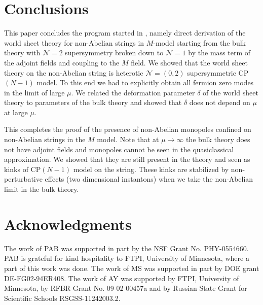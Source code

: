 \documentclass[12pt]{article}
\newcommand{\ntwo}{${\mathcal N}=2$ }
\newcommand{\ntwoo}{${\mathcal N}= \left(0,2\right) $ }
\newcommand{\none}{${\mathcal N}=1$ }
\begin{document}
\section{Conclusions}
\setcounter{equation}{0}

This paper concludes the program started in \cite{GSYmmodel},
namely direct derivation of the world sheet theory  for non-Abelian strings in $M$-model
starting from the bulk theory with \ntwo supersymmetry broken down to \none
by the mass term of the adjoint fields and coupling to the $M$ field.
We showed  that the world sheet
theory on the non-Abelian string is heterotic \ntwoo supersymmetric CP$(N-1)$ model.
To this end we had to explicitly obtain all fermion zero modes
 in the limit of  large $\mu $.
We related the  deformation parameter $\delta$ of the world sheet theory
to parameters of the bulk theory and showed that $\delta$
does not depend on $\mu$ at large $\mu$.

This completes the proof of the presence of non-Abelian monopoles confined on non-Abelian
strings in the $M$ model. Note that at  $\mu\to\infty$ the bulk theory does not have adjoint fields
and monopoles cannot be seen in the quasiclassical approximation. We showed that they are still
present in the theory and seen as  kinks of CP$(N-1)$ model on the string. These kinks
are stabilized by non-perturbative effects (two dimensional instantons) 
when we take the non-Abelian limit in the bulk theory.







\section*{Acknowledgments}

The work of PAB was supported in part by the NSF Grant No. PHY-0554660. PAB is grateful for kind
hospitality to FTPI, University of Minnesota, where a part of this work was done. 
The work of MS was supported in part by DOE grant DE-FG02-94ER408. 
The work of AY was  supported 
by  FTPI, University of Minnesota, 
by RFBR Grant No. 09-02-00457a 
and by Russian State Grant for 
Scientific Schools RSGSS-11242003.2.
\end{document}

